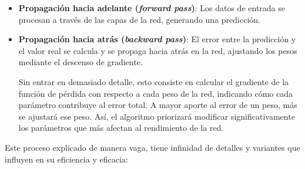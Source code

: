 \begin{itemize}

    \item \textbf{Propagación hacia adelante (\textit{forward pass})}: Los datos de entrada se procesan a 
    través de las capas de la red, generando una predicción. 

    \item \textbf{Propagación hacia atrás (\textit{backward pass})}: El error entre la predicción y el valor 
    real se calcula y se propaga hacia atrás en la red, ajustando los pesos mediante el descenso de gradiente.
    
    Sin entrar en demasiado detalle, esto consiste en calcular el gradiente de la función de pérdida con           %
    respecto a cada peso de la red, indicando cómo cada parámetro contribuye al error total. 
    A mayor aporte al error de un peso, más se ajustará ese peso. Así, el algoritmo priorizará modificar 
    significativamente los parámetros que más afectan al rendimiento de la red.
    
\end{itemize}

Este proceso explicado de manera vaga, tiene infinidad de detalles y variantes que influyen en su eficiencia y
eficacia:

